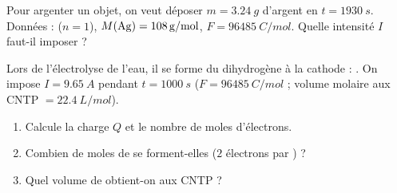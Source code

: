 \documentclass[11pt,a4paper]{article}
\begin{document}
\begin{exo}
Pour argenter un objet, on veut déposer $m=\qty{3.24}{g}$ d'argent en $t=\qty{1930}{s}$. Données :
 ($n=1$), $M(\ce{Ag})=\qty{108}{g\per mol}$, $F=\qty{96485}{C\per mol}$. Quelle
intensité $I$ faut-il imposer ?
\end{exo}

\begin{exo}
Lors de l'électrolyse de l'eau, il se forme du dihydrogène à la cathode :
. On impose $I=\qty{9.65}{A}$ pendant $t=\qty{1000}{s}$
($F=\qty{96485}{C\per mol}$ ; volume molaire aux CNTP $=\qty{22.4}{L\per mol}$).
\begin{enumerate}[label=\alph*)]
  \item Calcule la charge $Q$ et le nombre de moles d'électrons.
  \item Combien de moles de  se forment-elles ($2$ électrons par ) ?
  \item Quel volume de  obtient-on aux CNTP ?
\end{enumerate}
\end{exo}
\end{document}
